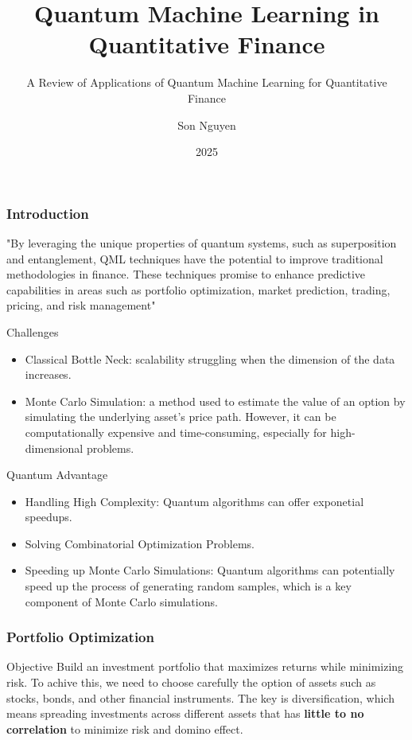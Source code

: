 \documentclass{beamer}
\title{Quantum Machine Learning in Quantitative Finance}
\subtitle{A Review of Applications of Quantum Machine Learning for Quantitative
Finance}
\author{Son Nguyen}
\institute{Stevens Institute of Technology}
\date{2025}
\begin{document}
\frame{\titlepage}
\begin{frame}
	\frametitle{Introduction}
	"By leveraging the unique properties of quantum systems,
	such as superposition and entanglement, QML techniques have the potential to improve traditional
	methodologies in finance. These techniques promise to enhance predictive capabilities in areas such
	as portfolio optimization, market prediction, trading, pricing, and risk management"
\end{frame}
\begin{frame}
	\begin{block}{Challenges}
		\begin{itemize}
			\item Classical Bottle Neck: scalability struggling when the dimension of the data increases.
			\item Monte Carlo Simulation: a method used to estimate the value of an option by simulating the underlying asset's price path. However, it can be computationally expensive and time-consuming, especially for high-dimensional problems.
		\end{itemize}
	\end{block}
	\begin{block}{Quantum Advantage}
		\begin{itemize}
			\item Handling High Complexity: Quantum algorithms can offer exponetial speedups.
			\item Solving Combinatorial Optimization Problems.
			\item Speeding up Monte Carlo Simulations: Quantum algorithms can potentially speed up the process of generating random samples, which is a key component of Monte Carlo simulations.
		\end{itemize}

	\end{block}
\end{frame}
\begin{frame}
	\frametitle{Portfolio Optimization}
	\begin{block}{Objective}
		Build an investment portfolio that maximizes returns while minimizing risk. To achive this, we need to choose carefully the option of assets such as
		stocks, bonds, and other financial instruments. The key is diversification, which means spreading investments across different assets that has \textbf{little to no correlation} to minimize risk and domino effect.
	\end{block}
\end{frame}
\end{document}
